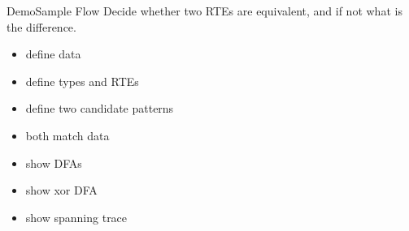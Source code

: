 \begin{frame}{Demo}{Sample Flow}
  Decide whether two RTEs are equivalent, and if not what is the difference.


  \begin{itemize}
  \item define data
  \item define types and RTEs
  \item define two candidate patterns
  \item both match data
  \item show DFAs
  \item show xor DFA
  \item show spanning trace
  \end{itemize}

\end{frame}




